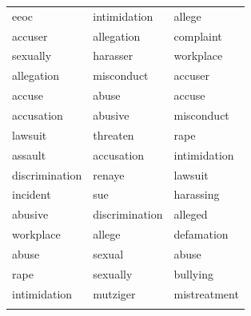 \documentclass[output=paper]{langsci/langscibook}
\begin{document}
\begin{table}
\begin{tabular}{lll}
eeoc&intimidation&allege\\
accuser&allegation&complaint\\
sexually&harasser&workplace\\
allegation&misconduct&accuser\\
accuse&abuse&accuse\\
accusation&abusive&misconduct\\
lawsuit&threaten&rape\\
assault&accusation&intimidation\\
discrimination&renaye&lawsuit\\
incident&sue&harassing\\
abusive&discrimination&alleged\\
workplace&allege&defamation\\
abuse&sexual&abuse\\
rape&sexually&bullying\\
intimidation&mutziger&mistreatment\\
\lspbottomrule
\end{tabular}
\end{table}
\end{document}
